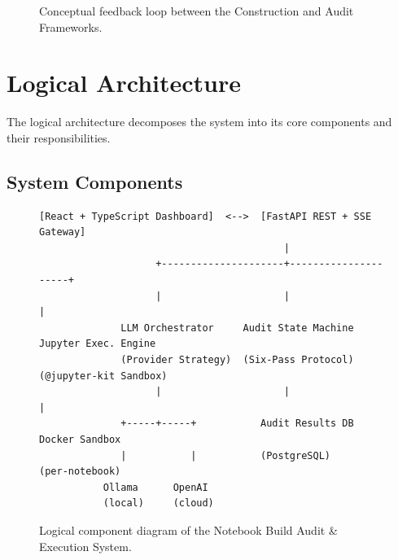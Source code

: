 \documentclass[11pt, a4paper]{article}
\begin{document}
\begin{figure}[ht]
  \centering
  \caption{Conceptual feedback loop between the Construction and Audit
           Frameworks.}
  \label{fig:lifecycle}
\end{figure}

\section{Logical Architecture}
\label{sec:logical-arch}

The logical architecture decomposes the system into its core components and
their responsibilities.

\subsection*{System Components}

\begin{figure}[ht]
  \centering
  \begin{verbatim}
[React + TypeScript Dashboard]  <-->  [FastAPI REST + SSE Gateway]
                                          |
                    +---------------------+---------------------+
                    |                     |                     |
              LLM Orchestrator     Audit State Machine   Jupyter Exec. Engine
              (Provider Strategy)  (Six-Pass Protocol)   (@jupyter-kit Sandbox)
                    |                     |                     |
              +-----+-----+           Audit Results DB      Docker Sandbox
              |           |           (PostgreSQL)          (per-notebook)
           Ollama      OpenAI
           (local)     (cloud)
  \end{verbatim}
  \caption{Logical component diagram of the Notebook Build Audit \& Execution
           System.}
  \label{fig:logical-arch}
\end{figure}
\end{document}
